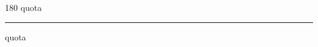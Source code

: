 
\begin{frame}
\begin{center}
\begin{turn}{180}
{\fontsize{2.5cm}{1em}\selectfont quota}
\end{turn}
\vspace{1em}\par  
\hrule
\vspace{1em}\par  
{\fontsize{2.5cm}{1em}\selectfont quota}
\end{center}
\end{frame}
